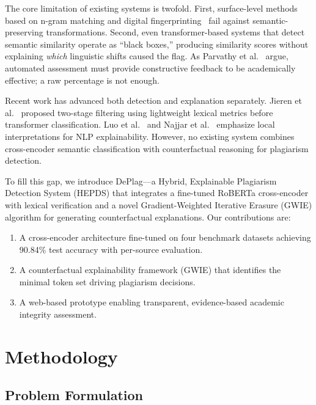 \documentclass[pdflatex,sn-basic]{sn-jnl}
\begin{document}
The core limitation of existing systems is twofold. First, surface-level methods based on n-gram matching and digital fingerprinting~\cite{foltynek2019academic, samen2022semantic} fail against semantic-preserving transformations. Second, even transformer-based systems that detect semantic similarity operate as ``black boxes,'' producing similarity scores without explaining \textit{which} linguistic shifts caused the flag. As Parvathy et al.~\cite{parvathy2025automated} argue, automated assessment must provide constructive feedback to be academically effective; a raw percentage is not enough.

Recent work has advanced both detection and explanation separately. Jieren et al.~\cite{jieren2025twostage} proposed two-stage filtering using lightweight lexical metrics before transformer classification. Luo et al.~\cite{luo2024local} and Najjar et al.~\cite{najjar2025leveraging} emphasize local interpretations for NLP explainability. However, no existing system combines cross-encoder semantic classification with counterfactual reasoning for plagiarism detection.

To fill this gap, we introduce DePlag---a Hybrid, Explainable Plagiarism Detection System (HEPDS) that integrates a fine-tuned RoBERTa cross-encoder with lexical verification and a novel Gradient-Weighted Iterative Erasure (GWIE) algorithm for generating counterfactual explanations. Our contributions are:
\begin{enumerate}
    \item A cross-encoder architecture fine-tuned on four benchmark datasets achieving 90.84\% test accuracy with per-source evaluation.
    \item A counterfactual explainability framework (GWIE) that identifies the minimal token set driving plagiarism decisions.
    \item A web-based prototype enabling transparent, evidence-based academic integrity assessment.
\end{enumerate}

\section{Methodology}

\subsection{Problem Formulation}
\end{document}
